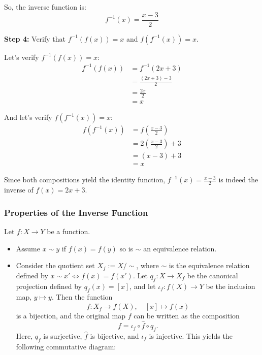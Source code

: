 So, the inverse function is:
\[
f^{-1}(x) = \frac{x - 3}{2}
\]

\textbf{Step 4:} Verify that $f^{-1}(f(x)) = x$ and $f(f^{-1}(x)) = x$.

Let's verify $f^{-1}(f(x)) = x$:
\begin{align}
f^{-1}(f(x)) &= f^{-1}(2x + 3)\\
&= \frac{(2x + 3) - 3}{2}\\
&= \frac{2x}{2}\\
&= x
\end{align}

And let's verify $f(f^{-1}(x)) = x$:
\begin{align}
f(f^{-1}(x)) &= f\left(\frac{x - 3}{2}\right)\\
&= 2\left(\frac{x - 3}{2}\right) + 3\\
&= (x - 3) + 3\\
&= x
\end{align}

Since both compositions yield the identity function, $f^{-1}(x) = \frac{x - 3}{2}$ is indeed the inverse of $f(x) = 2x + 3$.


\subsubsection{Properties of the Inverse Function}
Let $f:X\rightarrow Y$ be a function.

\begin{itemize}
    \item Assume $x \sim y $ if $f(x)= f(y)$ so is $\sim$ an equivalence relation.

    \item Consider the quotient set \( X_f := X/\sim \), where \( \sim \) is the equivalence relation defined by \( x \sim x' \iff f(x) = f(x') \). Let \( q_f : X \to X_f \) be the canonical projection defined by \( q_f(x) = [x] \), and let \( \iota_f : f(X) \to Y \) be the inclusion map, \( y \mapsto y \). Then the function
\[
\hat{f} : X_f \to f(X), \quad [x] \mapsto f(x)
\]
is a bijection, and the original map \( f \) can be written as the composition
\[
f = \iota_f \circ \hat{f} \circ q_f.
\]
Here, \( q_f \) is surjective, \( \hat{f} \) is bijective, and \( \iota_f \) is injective. This yields the following commutative diagram:
\begin{center}
\end{center}


\end{itemize}


